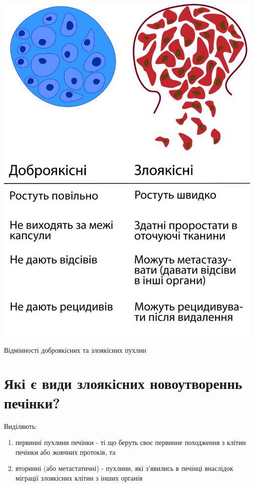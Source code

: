 \begin{marginfigure}[20pt]%
  \includegraphics[width=\linewidth]{Figures/Benign vs malignant.png}
  \caption{Відмінності доброякісних та злоякісних пухлин}
  \label{fig:benignvsmalignant}
\end{marginfigure}

\section{Які є види злоякісних новоутвореннь печінки?}

Виділяють: 
\begin{enumerate}
    \item первинні пухлини печінки - ті що беруть своє первинне походження з клітин печінки або жовчних протоків, та
    \item вторинні (або метастатичні) - пухлини, які з’явились в печінці внаслідок міграції злоякісних клітин з інших органів
\end{enumerate} 

